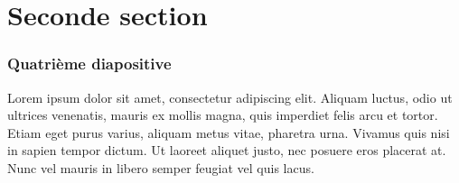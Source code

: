 \documentclass{beamer}
\begin{document}
\section{Seconde section}
\begin{frame}
\frametitle{Quatrième diapositive}

Lorem ipsum dolor sit amet, consectetur adipiscing elit. Aliquam luctus, odio ut ultrices venenatis, mauris ex mollis magna, quis imperdiet felis arcu et tortor. Etiam eget purus varius, aliquam metus vitae, pharetra urna. Vivamus quis nisi in sapien tempor dictum. Ut laoreet aliquet justo, nec posuere eros placerat at. Nunc vel mauris in libero semper feugiat vel quis lacus.

\end{frame}
\end{document}
